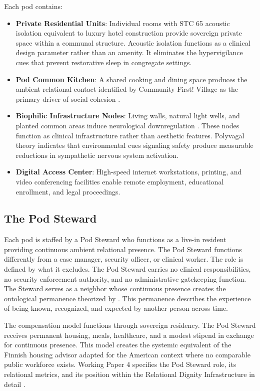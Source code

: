 \documentclass[12pt, letterpaper]{article}
\begin{document}
Each pod contains:

\begin{itemize}
    \item \textbf{Private Residential Units}: Individual rooms with STC 65 acoustic isolation equivalent to luxury hotel construction provide sovereign private space within a communal structure. Acoustic isolation functions as a clinical design parameter rather than an amenity. It eliminates the hypervigilance cues that prevent restorative sleep in congregate settings.
    \item \textbf{Pod Common Kitchen}: A shared cooking and dining space produces the ambient relational contact identified by Community First! Village as the primary driver of social cohesion \citep{mlf_2024}.
    \item \textbf{Biophilic Infrastructure Nodes}: Living walls, natural light wells, and planted common areas induce neurological downregulation \citep{porges_2011}. These nodes function as clinical infrastructure rather than aesthetic features. Polyvagal theory indicates that environmental cues signaling safety produce measurable reductions in sympathetic nervous system activation.
    \item \textbf{Digital Access Center}: High-speed internet workstations, printing, and video conferencing facilities enable remote employment, educational enrollment, and legal proceedings.
\end{itemize}

\subsection{The Pod Steward}

Each pod is staffed by a Pod Steward who functions as a live-in resident providing continuous ambient relational presence. The Pod Steward functions differently from a case manager, security officer, or clinical worker. The role is defined by what it excludes. The Pod Steward carries no clinical responsibilities, no security enforcement authority, and no administrative gatekeeping function. The Steward serves as a neighbor whose continuous presence creates the ontological permanence theorized by \citet{giddens_1991}. This permanence describes the experience of being known, recognized, and expected by another person across time.

The compensation model functions through sovereign residency. The Pod Steward receives permanent housing, meals, healthcare, and a modest stipend in exchange for continuous presence. This model creates the systemic equivalent of the Finnish housing advisor adapted for the American context where no comparable public workforce exists. Working Paper 4 specifies the Pod Steward role, its relational metrics, and its position within the Relational Dignity Infrastructure in detail \citep{dibella_2026_wp4}.
\end{document}
